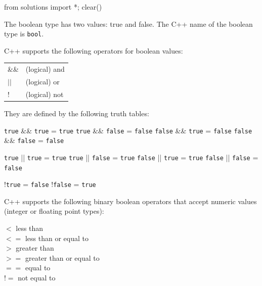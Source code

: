 \begin{python0}
from solutions import *; clear()
\end{python0}

The boolean type has two values: true and false. The C++ name of the boolean type is \verb!bool!.

C++ supports the following operators for boolean values:

\begin{tabular}{p{1cm} p{3cm}}
  \&\& & (logical) and\\
  $||$ & (logical) or\\
  ! & (logical) not\\
\end{tabular}
  
They are defined by the following truth tables:



\begin{center}
\verb!true! \&\& \verb!true!  = \verb!true!
\verb!true! \&\& \verb!false!  = \verb!false!
\verb!false! \&\& \verb!true!  = \verb!false!
\verb!false! \&\& \verb!false!  = \verb!false!

\verb!true! || \verb!true!  = \verb!true!
\verb!true! || \verb!false!  = \verb!true!
\verb!false! || \verb!true!  = \verb!true!
\verb!false! || \verb!false!  = \verb!false!

!\verb!true!  = \verb!false!
!\verb!false!  = \verb!true!
\end{center}

C++ supports the following binary boolean operators that accept numeric
values (integer or floating point types):

\begin{center}
  $<$   less than\\
  $<=$  less than or equal to\\
  $>$   greater than\\
  $>=$  greater than or equal to\\
  $==$  equal to\\
  $!=$  not equal to\\
\end{center}


